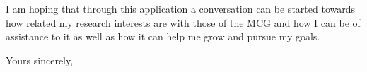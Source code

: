 \documentclass[a4paper]{letter}
\begin{document}
\begin{letter}{}
I am hoping that through this application a conversation can be started towards
how related my research interests are with those of the MCG and how I can be of
assistance to it as well as how it can help me grow and pursue my goals. 

\closing{Yours sincerely,} 

\end{letter}
\end{document}
